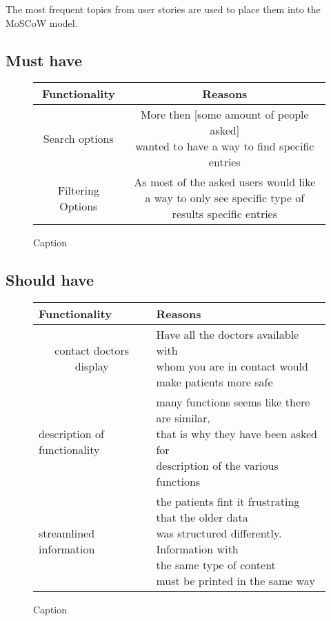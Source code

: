 \documentclass[a4paper,11pt]{article}
\begin{document}
The most frequent topics from user stories are used to place them into the MoSCoW model.

\subsection{Must have}
\begin{figure}[H]{\textwidth}
    \centering
    \begin{tabular}{|c|c|}
    \hline
     \textbf{Functionality} & \textbf{Reasons} \\\hline
     Search options &\makecell{More then [some amount of people asked]\\ wanted to have a way to find specific entries}  \\\hline
     Filtering Options & \makecell{As most of the asked users would like \\a way to only see specific type of results specific entries } \\\hline
\end{tabular}{}
    \caption{Caption}
    \label{fig:my_label}
\end{figure}{}

\subsection{Should have}

\begin{figure}[H]{\textwidth}
    \centering
    
\begin{tabular}{|l|l|}
\hline
\textbf{Functionality} & \textbf{Reasons} \\\hline                                    
\multicolumn{1}{|c|}{contact doctors display}                 & \makecell{Have all the doctors available with\\ whom you are in contact would \\make patients more safe}                                             \\ \hline
description of functionality                                  & \makecell{many functions seems like there are similar, \\that is why they have been asked for \\description of the various functions}                                   \\ \hline
streamlined information                                       & \makecell{the patients fint it frustrating that the older data\\ was structured differently. Information with\\ the same type of content\\ must be printed in the same way} \\ \hline
\end{tabular}

    \caption{Caption}
    \label{fig:my_label}
\end{figure}{}
\end{document}
